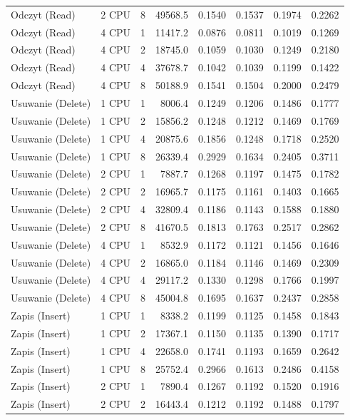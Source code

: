 \begin{table}[ht]
{\begin{tabular}{llcrrrrr}
Odczyt (Read) & 2 CPU & 8 & 49568.5 & 0.1540 & 0.1537 & 0.1974 & 0.2262 \\
Odczyt (Read) & 4 CPU & 1 & 11417.2 & 0.0876 & 0.0811 & 0.1019 & 0.1269 \\
Odczyt (Read) & 4 CPU & 2 & 18745.0 & 0.1059 & 0.1030 & 0.1249 & 0.2180 \\
Odczyt (Read) & 4 CPU & 4 & 37678.7 & 0.1042 & 0.1039 & 0.1199 & 0.1422 \\
Odczyt (Read) & 4 CPU & 8 & 50188.9 & 0.1541 & 0.1504 & 0.2000 & 0.2479 \\
Usuwanie (Delete) & 1 CPU & 1 & 8006.4 & 0.1249 & 0.1206 & 0.1486 & 0.1777 \\
Usuwanie (Delete) & 1 CPU & 2 & 15856.2 & 0.1248 & 0.1212 & 0.1469 & 0.1769 \\
Usuwanie (Delete) & 1 CPU & 4 & 20875.6 & 0.1856 & 0.1248 & 0.1718 & 0.2520 \\
Usuwanie (Delete) & 1 CPU & 8 & 26339.4 & 0.2929 & 0.1634 & 0.2405 & 0.3711 \\
Usuwanie (Delete) & 2 CPU & 1 & 7887.7 & 0.1268 & 0.1197 & 0.1475 & 0.1782 \\
Usuwanie (Delete) & 2 CPU & 2 & 16965.7 & 0.1175 & 0.1161 & 0.1403 & 0.1665 \\
Usuwanie (Delete) & 2 CPU & 4 & 32809.4 & 0.1186 & 0.1143 & 0.1588 & 0.1880 \\
Usuwanie (Delete) & 2 CPU & 8 & 41670.5 & 0.1813 & 0.1763 & 0.2517 & 0.2862 \\
Usuwanie (Delete) & 4 CPU & 1 & 8532.9 & 0.1172 & 0.1121 & 0.1456 & 0.1646 \\
Usuwanie (Delete) & 4 CPU & 2 & 16865.0 & 0.1184 & 0.1146 & 0.1469 & 0.2309 \\
Usuwanie (Delete) & 4 CPU & 4 & 29117.2 & 0.1330 & 0.1298 & 0.1766 & 0.1997 \\
Usuwanie (Delete) & 4 CPU & 8 & 45004.8 & 0.1695 & 0.1637 & 0.2437 & 0.2858 \\
Zapis (Insert) & 1 CPU & 1 & 8338.2 & 0.1199 & 0.1125 & 0.1458 & 0.1843 \\
Zapis (Insert) & 1 CPU & 2 & 17367.1 & 0.1150 & 0.1135 & 0.1390 & 0.1717 \\
Zapis (Insert) & 1 CPU & 4 & 22658.0 & 0.1741 & 0.1193 & 0.1659 & 0.2642 \\
Zapis (Insert) & 1 CPU & 8 & 25752.4 & 0.2966 & 0.1613 & 0.2486 & 0.4158 \\
Zapis (Insert) & 2 CPU & 1 & 7890.4 & 0.1267 & 0.1192 & 0.1520 & 0.1916 \\
Zapis (Insert) & 2 CPU & 2 & 16443.4 & 0.1212 & 0.1192 & 0.1488 & 0.1797 \\

\end{tabular}}
\end{table}
